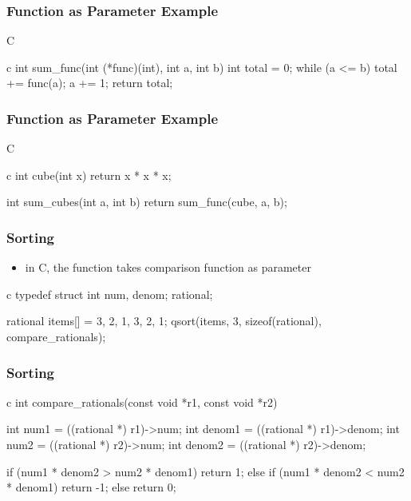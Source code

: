 \documentclass[dvipsnames]{beamer}
\theoremstyle{plain}
\begin{document}
\begin{frame}[fragile]
  \frametitle{Function as Parameter Example}

  \begin{exampleblock}{C}
    \begin{pygments}{c}
int sum_func(int (*func)(int), int a, int b)
{
    int total = 0;
    while (a <= b) {
        total += func(a);
        a += 1;
    }
    return total;
}
    \end{pygments}
  \end{exampleblock}
\end{frame}

\begin{frame}[fragile]
  \frametitle{Function as Parameter Example}

  \begin{exampleblock}{C}
    \begin{pygments}{c}
int cube(int x)
{
    return x * x * x;
}

int sum_cubes(int a, int b)
{
    return sum_func(cube, a, b);
}
    \end{pygments}
  \end{exampleblock}
\end{frame}

\begin{frame}[fragile]
  \frametitle{Sorting}

  \begin{itemize}
    \item in C, the  function takes comparison function as parameter
  \end{itemize}

  \begin{exampleblock}{}
    \begin{pygments}{c}
typedef struct {
    int num, denom;
} rational;

rational items[] = {{3, 2}, {1, 3}, {2, 1}};
qsort(items, 3, sizeof(rational), compare_rationals);
    \end{pygments}
  \end{exampleblock}
\end{frame}

\begin{frame}[fragile]
  \frametitle{Sorting}

  \begin{exampleblock}{}
    \begin{pygments}{c}
int compare_rationals(const void *r1, const void *r2)
{
    int num1 = ((rational *) r1)->num;
    int denom1 = ((rational *) r1)->denom;
    int num2 = ((rational *) r2)->num;
    int denom2 = ((rational *) r2)->denom;

    if (num1 * denom2 > num2 * denom1)
        return 1;
    else if (num1 * denom2 < num2 * denom1)
        return -1;
    else
        return 0;
}
    \end{pygments}
  \end{exampleblock}
\end{frame}
\end{document}
